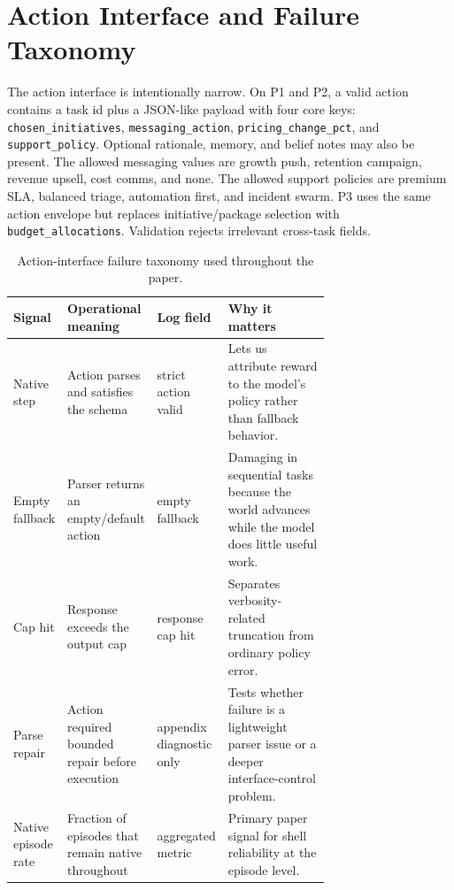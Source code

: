 \section{Action Interface and Failure Taxonomy}

The action interface is intentionally narrow. On P1 and P2, a valid action
contains a task id plus a JSON-like payload with four core keys:
\texttt{chosen\_initiatives}, \texttt{messaging\_action},
\texttt{pricing\_change\_pct}, and \texttt{support\_policy}. Optional
rationale, memory, and belief notes may also be present. The allowed messaging
values are growth push, retention campaign, revenue upsell, cost comms, and
none. The allowed support policies are premium SLA, balanced triage,
automation first, and incident swarm. P3 uses the same action envelope but
replaces initiative/package selection with \texttt{budget\_allocations}.
Validation rejects irrelevant cross-task fields.

\begin{table}[tbp]
  \centering
  \scriptsize
  \setlength{\tabcolsep}{3pt}
  \begin{tabular}{lp{0.20\linewidth}p{0.16\linewidth}p{0.35\linewidth}}
    \toprule
    Signal & Operational meaning & Log field & Why it matters \\
    \midrule
    Native step & Action parses and satisfies the schema & strict action valid & Lets us attribute reward to the model's policy rather than fallback behavior. \\
    Empty fallback & Parser returns an empty/default action & empty fallback & Damaging in sequential tasks because the world advances while the model does little useful work. \\
    Cap hit & Response exceeds the output cap & response cap hit & Separates verbosity-related truncation from ordinary policy error. \\
    Parse repair & Action required bounded repair before execution & appendix diagnostic only & Tests whether failure is a lightweight parser issue or a deeper interface-control problem. \\
    Native episode rate & Fraction of episodes that remain native throughout & aggregated metric & Primary paper signal for shell reliability at the episode level. \\
    \bottomrule
  \end{tabular}
  \caption{Action-interface failure taxonomy used throughout the paper.}
  \label{tab:failtaxonomy}
\end{table}

